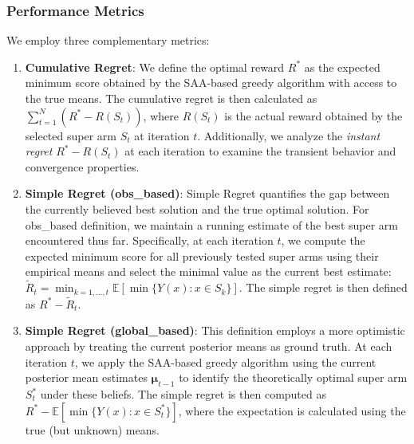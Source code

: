 \documentclass[opre,sglanonrev]{informs4}
\begin{document}
\subsubsection{Performance Metrics}

We employ three complementary metrics:

\begin{enumerate}
    \item \textbf{Cumulative Regret}: We define the optimal reward $R^*$ as the expected minimum score obtained by the SAA-based greedy algorithm with access to the true means. The cumulative regret is then calculated as $\sum_{t=1}^{N} (R^* - R(S_t))$, where $R(S_t)$ is the actual reward obtained by the selected super arm $S_t$ at iteration $t$. Additionally, we analyze the \textit{instant regret} $R^* - R(S_t)$ at each iteration to examine the transient behavior and convergence properties.

    \item \textbf{Simple Regret (obs\_based)}: Simple Regret quantifies the gap between the currently believed best solution and the true optimal solution. For obs\_based definition, we maintain a running estimate of the best super arm encountered thus far. Specifically, at each iteration $t$, we compute the expected minimum score for all previously tested super arms using their empirical means and select the minimal value as the current best estimate: $\tilde{R}_t = \min_{k=1,\ldots,t} \mathbb{E}[\min\{Y(x) : x \in S_k\}]$. The simple regret is then defined as $R^* - \tilde{R}_t$.

    \item \textbf{Simple Regret (global\_based)}: This definition employs a more optimistic approach by treating the current posterior means as ground truth. At each iteration $t$, we apply the SAA-based greedy algorithm using the current posterior mean estimates $\boldsymbol{\mu}_{t-1}$ to identify the theoretically optimal super arm $S_t^*$ under these beliefs. The simple regret is then computed as $R^* - \mathbb{E}[\min\{Y(x) : x \in S_t^*\}]$, where the expectation is calculated using the true (but unknown) means.
\end{enumerate}
\end{document}
